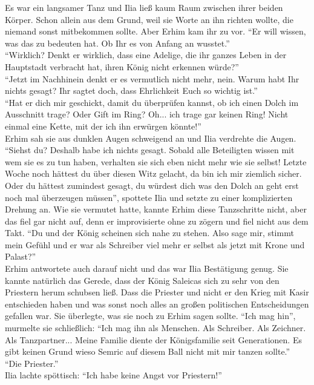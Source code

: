 Es war ein langsamer Tanz und Ilia ließ kaum Raum zwischen ihrer beiden Körper. Schon allein aus 
dem Grund, weil sie Worte an ihn richten wollte, die niemand sonst mitbekommen sollte. Aber Erhim 
kam ihr zu vor. ``Er will wissen, was das zu bedeuten hat. Ob Ihr es von Anfang an wusstet.''\\
``Wirklich? Denkt er wirklich, dass eine Adelige, die ihr ganzes Leben in der Hauptstadt verbracht 
hat, ihren König nicht erkennen würde?''\\
``Jetzt im Nachhinein denkt er es vermutlich nicht mehr, nein. Warum habt Ihr nichts gesagt? Ihr 
sagtet doch, dass Ehrlichkeit Euch so wichtig ist.''\\
``Hat er dich mir geschickt, damit du überprüfen kannst, ob ich einen Dolch im Ausschnitt trage? 
Oder Gift im Ring? Oh... ich trage gar keinen Ring! Nicht einmal eine Kette, mit der ich ihn 
erwürgen könnte!''\\
Erhim sah sie aus dunklen Augen schweigend an und Ilia verdrehte die Augen. ``Siehst du? Deshalb 
habe ich nichts gesagt. Sobald alle Beteiligten wissen mit wem sie es zu tun haben, verhalten sie 
sich eben nicht mehr wie sie selbst! Letzte Woche noch hättest du über diesen Witz gelacht, da bin 
ich mir ziemlich sicher. Oder du hättest zumindest gesagt, du würdest dich was den Dolch an geht 
erst noch mal überzeugen müssen'', spottete Ilia und setzte zu einer komplizierten Drehung an. Wie 
sie vermutet hatte, kannte Erhim diese Tanzschritte nicht, aber das fiel gar nicht auf, denn er 
improvisierte ohne zu zögern und fiel nicht aus dem Takt. ``Du und der König scheinen sich nahe zu 
stehen. Also sage mir, stimmt mein Gefühl und er war als Schreiber viel mehr er selbst als 
jetzt mit Krone und Palast?''\\
Erhim antwortete auch darauf nicht und das war Ilia Bestätigung genug. Sie kannte natürlich das 
Gerede, dass der König Saleicas sich zu sehr von den Priestern herum schubsen ließ. Dass die 
Priester und nicht er den Krieg mit Kasir entschieden haben und was sonst noch alles an großen 
politischen Entscheidungen gefallen war. Sie überlegte, was sie noch zu Erhim sagen sollte. ``Ich 
mag hin'', murmelte sie schließlich: ``Ich mag ihn als Menschen. Als Schreiber. Als Zeichner. Als 
Tanzpartner... Meine Familie diente der Königsfamilie seit Generationen. Es gibt keinen Grund wieso 
Semric auf diesem Ball nicht mit mir tanzen sollte.''\\
``Die Priester.''\\
Ilia lachte spöttisch: ``Ich habe keine Angst vor Priestern!''\\
